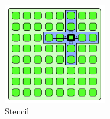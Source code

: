 \documentclass[xcolor={usenames,dvipsnames},12pt,presentation,aspectratio=169]{beamer}
\begin{document}
\begin{frame}
\begin{columns}
\begin{column}{0.4\textwidth}
\begin{flushleft}
          \begin{figure}
        \includegraphics[width=0.4\textwidth]{stencil.png}
            \caption{Stencil}
          \end{figure}
        \end{flushleft}
     \end{column}
   \end{columns}
\end{frame}
\end{document}
